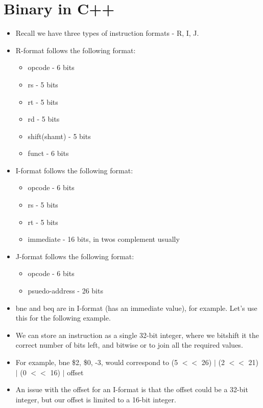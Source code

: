 \documentclass[12pt]{article}
\begin{document}
\section{Binary in C++}
\begin{itemize}
    \item Recall we have three types of instruction formats - R, I, J.  
    \item R-format follows the following format: 
        \begin{itemize}
            \item opcode - 6 bits
            \item rs - 5 bits
            \item rt - 5 bits
            \item rd - 5 bits
            \item shift(shamt) - 5 bits
            \item funct - 6 bits
        \end{itemize}
    \item I-format follows the following format:
        \begin{itemize}
            \item opcode - 6 bits
            \item rs - 5 bits
            \item rt - 5 bits
            \item immediate - 16 bits, in twos complement usually
        \end{itemize} 
    \item J-format follows the following format:
        \begin{itemize}
            \item opcode - 6 bits
            \item psuedo-address - 26 bits
        \end{itemize}
    \item bne and beq are in I-format (has an immediate value), for example.  Let's use this for the following example.
    \item We can store an instruction as a single 32-bit integer, where we bitshift it the correct number of bits left, and bitwise or to join all the required values.
    \item For example, bne \$2, \$0, -3, would correspond to (5 $<<$ 26) $|$ (2 $<<$ 21) $|$ (0 $<<$ 16) $|$ offset
    \item An issue with the offset for an I-format is that the offset could be a 32-bit integer, but our offset is limited to a 16-bit integer.  

\end{itemize}
\end{document}
